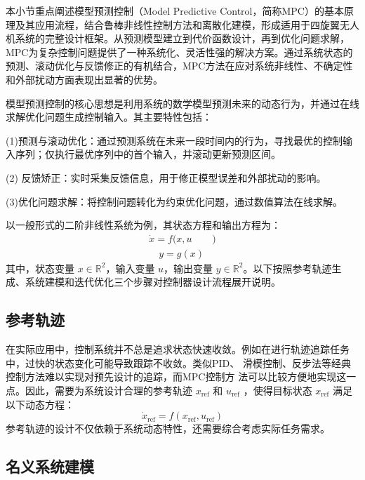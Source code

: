 \documentclass[lang=chs, degree=master, blindreview=false, winfonts=true]{yanputhesis}
\begin{document}
本小节重点阐述模型预测控制（Model Predictive Control，简称MPC）的基本原理及其应用流程，结合鲁棒非线性控制方法和离散化建模，形成适用于四旋翼无人机系统的完整设计框架。从预测模型建立到代价函数设计，再到优化问题求解，MPC为复杂控制问题提供了一种系统化、灵活性强的解决方案。通过系统状态的预测、滚动优化与反馈修正的有机结合，MPC方法在应对系统非线性、不确定性和外部扰动方面表现出显著的优势。


模型预测控制的核心思想是利用系统的数学模型预测未来的动态行为，并通过在线求解优化问题生成控制输入。其主要特性包括：

(1)预测与滚动优化：通过预测系统在未来一段时间内的行为，寻找最优的控制输入序列；仅执行最优序列中的首个输入，并滚动更新预测区间。

(2) 反馈矫正：实时采集反馈信息，用于修正模型误差和外部扰动的影响。

(3)优化问题求解：将控制问题转化为约束优化问题，通过数值算法在线求解。


以一般形式的二阶非线性系统为例，其状态方程和输出方程为：
\begin{equation}
\begin{aligned}
	\dot{x} = f(x, u&)\\
	\quad y = g(x)&
\end{aligned}
 \label{3-19}
\end{equation}
其中，状态变量 $x \in \mathbb{R}^2$，输入变量 $u$，输出变量 $y \in \mathbb{R}^2$。以下按照参考轨迹生成、系统建模和迭代优化三个步骤对控制器设计流程展开说明。

\subsection{参考轨迹}
在实际应用中，控制系统并不总是追求状态快速收敛。例如在进行轨迹追踪任务中，过快的状态变化可能导致跟踪不收敛。类似PID、
滑模控制、反步法等经典控制方法难以实现对预先设计的追踪，而MPC控制方
法可以比较方便地实现这一点。因此，需要为系统设计合理的参考轨迹 $x_\text{ref}$ 和 $u_\text{ref}$ ，使得目标状态 $x_\text{ref}$ 满足以下动态方程：
\begin{equation}
	\dot{x}_\text{ref} = f(x_\text{ref}, u_\text{ref})
	\label{aa}
\end{equation}
参考轨迹的设计不仅依赖于系统动态特性，还需要综合考虑实际任务需求。

\subsection{名义系统建模}
\end{document}
